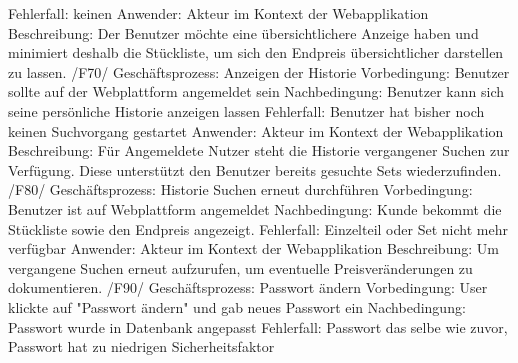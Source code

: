Fehlerfall: keinen\newline
Anwender: Akteur im Kontext der Webapplikation \newline
Beschreibung: Der Benutzer möchte eine übersichtlichere Anzeige haben und minimiert deshalb die Stückliste, um sich den Endpreis übersichtlicher darstellen zu lassen.\newline\newline
/F70/\newline
Geschäftsprozess: Anzeigen der Historie\newline
Vorbedingung: Benutzer sollte auf der Webplattform angemeldet sein\newline
Nachbedingung: Benutzer kann sich seine persönliche Historie anzeigen lassen\newline
Fehlerfall: Benutzer hat bisher noch keinen Suchvorgang gestartet\newline
Anwender: Akteur im Kontext der Webapplikation\newline
Beschreibung: Für Angemeldete Nutzer steht die Historie vergangener Suchen zur Verfügung. Diese unterstützt den Benutzer bereits gesuchte Sets wiederzufinden.\newline\newline
/F80/ \newline
Geschäftsprozess: Historie Suchen erneut durchführen \newline
Vorbedingung: Benutzer ist auf Webplattform angemeldet \newline
Nachbedingung: Kunde bekommt die Stückliste sowie den Endpreis angezeigt.\newline 
Fehlerfall: Einzelteil oder Set nicht mehr verfügbar \newline
Anwender: Akteur im Kontext der Webapplikation \newline
Beschreibung: Um vergangene Suchen erneut aufzurufen, um eventuelle  Preisveränderungen zu dokumentieren. \newline \newline \newline
/F90/ \newline
Geschäftsprozess: Passwort ändern \newline
Vorbedingung: User klickte auf "Passwort ändern" und gab neues Passwort ein \newline
Nachbedingung: Passwort wurde in Datenbank angepasst \newline
Fehlerfall: Passwort das selbe wie zuvor, Passwort hat zu niedrigen Sicherheitsfaktor \newline

